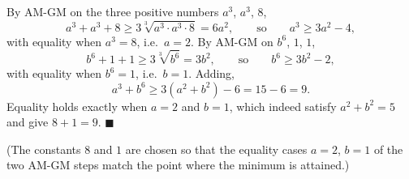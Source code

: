 By AM-GM on the three positive numbers $a^3$, $a^3$, $8$,
\[a^3+a^3+8\ge3\sqrt[3]{a^3\cdot a^3\cdot8}=6a^2,\qquad\text{so}\qquad a^3\ge3a^2-4,\]
with equality when $a^3=8$, i.e.\ $a=2$. By AM-GM on $b^6$, $1$, $1$,
\[b^6+1+1\ge3\sqrt[3]{b^6}=3b^2,\qquad\text{so}\qquad b^6\ge3b^2-2,\]
with equality when $b^6=1$, i.e.\ $b=1$. Adding,
\[a^3+b^6\ge3(a^2+b^2)-6=15-6=9.\]
Equality holds exactly when $a=2$ and $b=1$, which indeed satisfy $a^2+b^2=5$ and give $8+1=9$. $\blacksquare$

(The constants $8$ and $1$ are chosen so that the equality cases $a=2$, $b=1$ of the two AM-GM steps match the point where the minimum is attained.)
